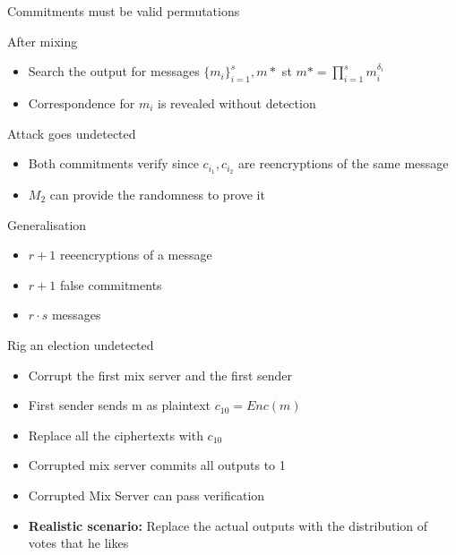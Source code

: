 \documentclass{beamer}
\begin{document}
\begin{frame}[allowframebreaks]{Commitments must be valid permutations}
\begin{block}{After mixing}
\begin{itemize}
\item Search the output for messages $\{m_i\}_{i=1}^s, m*$ st $m*=\prod_{i=1}^s m_i^{\delta_i}$
\item Correspondence for $m_i$ is revealed without detection
\end{itemize}
\end{block}

\begin{block}{Attack goes undetected}
\begin{itemize}
\item Both commitments verify since $c_{i_1},c_{i_2}$ are reencryptions of the same message
\item $M_2$ can provide the randomness to prove it
\end{itemize}
\end{block}

\begin{block}{Generalisation}
\begin{itemize}
\item $r+1$ reeencryptions of a message 
\item $r+1$ false commitments
\item $r \cdot s$ messages
\end{itemize}
\end{block}

\begin{block}{Rig an election undetected}
\begin{itemize}
\item Corrupt the first mix server and the first sender
\item First sender sends m as plaintext $c_{10} = Enc(m)$
\item Replace all the ciphertexts with $c_{10}$
\item Corrupted mix server commits all outputs to 1
\item Corrupted Mix Server can pass verification
\item \textbf{Realistic scenario:} Replace the actual outputs with the distribution of votes that he likes
\end{itemize}
\end{block}
 

\begin{columns}[onlytextwidth]


\end{columns}
\end{frame}
\end{document}
